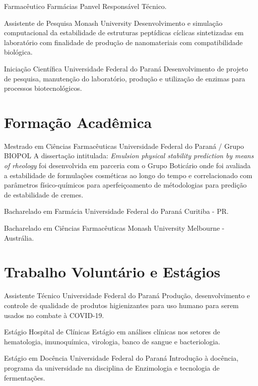 {Farmacêutico}
{Farmácias Panvel}
{Responsável Técnico.}

{Assistente de Pesquisa}
{Monash University}
{
	Desenvolvimento e simulação computacional da estabilidade 
	de estruturas peptídicas cíclicas sintetizadas em laboratório 
	com finalidade de produção de nanomateriais com compatibilidade biológica.
}

{Iniciação Científica}
{Universidade Federal do Paraná}
{
	Desenvolvimento de projeto de pesquisa, 
	manutenção do laboratório, 
	produção e utilização de enzimas para processos biotecnológicos.
}

\section{Formação Acadêmica}

{Mestrado em Ciências Farmacêuticas}
{Universidade Federal do Paraná / Grupo BIOPOL}
{
	A dissertação intitulada: \emph{Emulsion physical stability prediction by means of rheology}
	foi desenvolvida em parceria com o Grupo Boticário onde foi avaliada a estabilidade
	de formulações cosméticas ao longo do tempo e correlacionado com parâmetros 
	físico-químicos para aperfeiçoamento de métodologias para predição de estabilidade de cremes.
}

{Bacharelado em Farmácia}
{Universidade Federal do Paraná}
{Curitiba - PR.}

{Bacharelado em Ciências Farmacêuticas}
{Monash University}
{Melbourne - Austrália.}

\section{Trabalho Voluntário e Estágios}

{Assistente Técnico}
{Universidade Federal do Paraná}
{
	Produção, desenvolvimento e controle de qualidade de produtos higienizantes 
	para uso humano para serem usados no combate à COVID-19.
}

{Estágio}
{Hospital de Clínicas}
{Estágio em análises clínicas nos setores de hematologia, 
imunoquímica, virologia, banco de sangue e bacteriologia.}

{Estágio em Docência}
{Universidade Federal do Paraná}
{Introdução à docência, programa da universidade 
na disciplina de Enzimologia e tecnologia de fermentações.}

